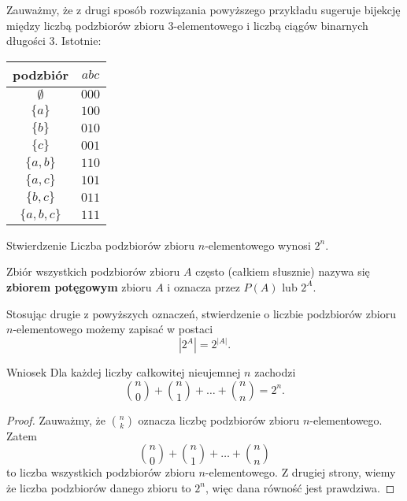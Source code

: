 \documentclass[a4paper,10pt]{beamer}
\begin{document}
\begin{frame}
	
	Zauważmy, że z drugi sposób rozwiązania powyższego przykładu sugeruje bijekcję między liczbą podzbiorów zbioru 3-elementowego i liczbą ciągów binarnych długości 3. Istotnie:
	
	\begin{center}\begin{tabular}{c|c}
			podzbiór&$abc$\\\hline
			$\emptyset$&$000$\\
			$\{a\}$&$100$\\
			$\{b\}$&$010$\\
			$\{c\}$&$001$\\
			$\{a,b\}$&$110$\\
			$\{a,c\}$&$101$\\
			$\{b,c\}$&$011$\\
			$\{a,b,c\}$&$111$\\
	\end{tabular}\end{center}

\end{frame}


\begin{frame}

\begin{block}{Stwierdzenie}
	Liczba podzbiorów zbioru $n$-elementowego wynosi $2^n$.
\end{block}

\begin{block}{}	
	Zbiór wszystkich podzbiorów zbioru $A$ często (całkiem słusznie) nazywa się {\bf zbiorem potęgowym} zbioru $A$ i oznacza przez $P(A)$ lub $2^A$.
	
	Stosując drugie z powyższych oznaczeń, stwierdzenie o liczbie podzbiorów zbioru $n$-elementowego możemy zapisać w postaci
	$$\left|2^A\right|=2^{|A|}.$$
\end{block}
\end{frame}

\begin{frame}
	\begin{block}{Wniosek}
		Dla każdej liczby całkowitej nieujemnej $n$ zachodzi
		$${n\choose 0}+{n\choose1}+\ldots+{n\choose n}=2^n.$$
	\end{block}
	
	\begin{proof}
	Zauważmy, że $\displaystyle{n\choose k}$ oznacza liczbę podzbiorów zbioru $n$-elementowego. Zatem $${n\choose 0}+{n\choose1}+\ldots+{n\choose n}$$ to liczba wszystkich podzbiorów zbioru $n$-elementowego. Z drugiej strony, wiemy że liczba podzbiorów danego zbioru to $2^n$, więc dana równość jest prawdziwa. 
	\end{proof}
	
\end{frame}
\end{document}
